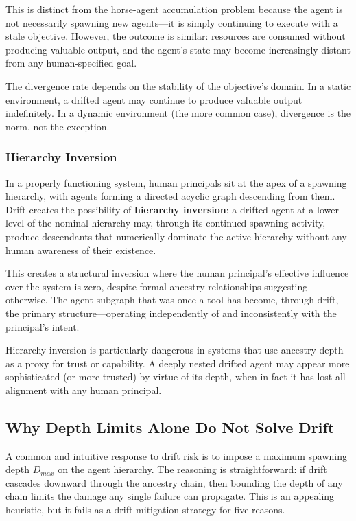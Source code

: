 This is distinct from the horse-agent accumulation problem because the agent is not necessarily spawning new agents—it is simply continuing to execute with a stale objective. However, the outcome is similar: resources are consumed without producing valuable output, and the agent's state may become increasingly distant from any human-specified goal.

The divergence rate depends on the stability of the objective's domain. In a static environment, a drifted agent may continue to produce valuable output indefinitely. In a dynamic environment (the more common case), divergence is the norm, not the exception.

\subsubsection{Hierarchy Inversion}

In a properly functioning system, human principals sit at the apex of a spawning hierarchy, with agents forming a directed acyclic graph descending from them. Drift creates the possibility of \textbf{hierarchy inversion}: a drifted agent at a lower level of the nominal hierarchy may, through its continued spawning activity, produce descendants that numerically dominate the active hierarchy without any human awareness of their existence.

This creates a structural inversion where the human principal's effective influence over the system is zero, despite formal ancestry relationships suggesting otherwise. The agent subgraph that was once a tool has become, through drift, the primary structure—operating independently of and inconsistently with the principal's intent.

Hierarchy inversion is particularly dangerous in systems that use ancestry depth as a proxy for trust or capability. A deeply nested drifted agent may appear more sophisticated (or more trusted) by virtue of its depth, when in fact it has lost all alignment with any human principal.

\subsection{Why Depth Limits Alone Do Not Solve Drift}

A common and intuitive response to drift risk is to impose a maximum spawning depth $D_{max}$ on the agent hierarchy. The reasoning is straightforward: if drift cascades downward through the ancestry chain, then bounding the depth of any chain limits the damage any single failure can propagate. This is an appealing heuristic, but it fails as a drift mitigation strategy for five reasons.

